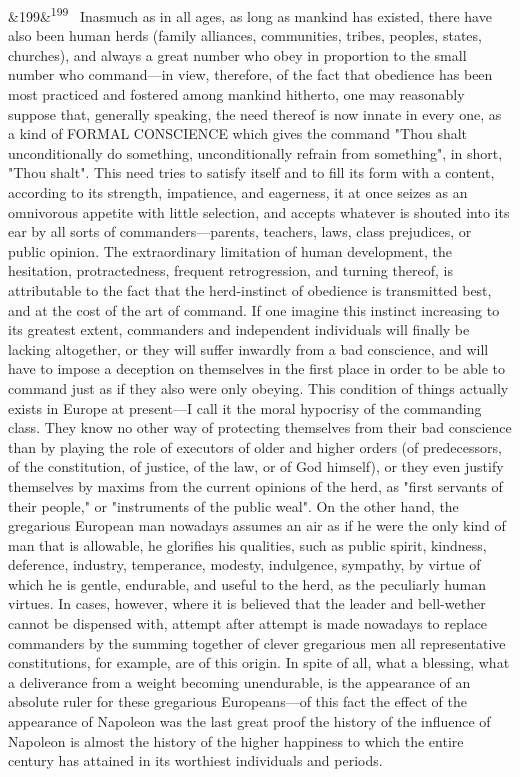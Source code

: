 \documentclass[12pt]{article}
\newcommand{\para}[1][]{\par\noindent\ifx&#1&\else\textsuperscript{\footnotesize #1}~\fi}
\begin{document}
\para[199] Inasmuch as in all ages, as long as mankind has existed, there have also been human herds (family alliances, communities, tribes, peoples, states, churches), and always a great number who obey in proportion to the small number who command---in view, therefore, of the fact that obedience has been most practiced and fostered among mankind hitherto, one may reasonably suppose that, generally speaking, the need thereof is now innate in every one, as a kind of FORMAL CONSCIENCE which gives the command "Thou shalt unconditionally do something, unconditionally refrain from something", in short, "Thou shalt". This need tries to satisfy itself and to fill its form with a content, according to its strength, impatience, and eagerness, it at once seizes as an omnivorous appetite with little selection, and accepts whatever is shouted into its ear by all sorts of commanders---parents, teachers, laws, class prejudices, or public opinion. The extraordinary limitation of human development, the hesitation, protractedness, frequent retrogression, and turning thereof, is attributable to the fact that the herd-instinct of obedience is transmitted best, and at the cost of the art of command. If one imagine this instinct increasing to its greatest extent, commanders and independent individuals will finally be lacking altogether, or they will suffer inwardly from a bad conscience, and will have to impose a deception on themselves in the first place in order to be able to command just as if they also were only obeying. This condition of things actually exists in Europe at present---I call it the moral hypocrisy of the commanding class. They know no other way of protecting themselves from their bad conscience than by playing the role of executors of older and higher orders (of predecessors, of the constitution, of justice, of the law, or of God himself), or they even justify themselves by maxims from the current opinions of the herd, as "first servants of their people," or "instruments of the public weal". On the other hand, the gregarious European man nowadays assumes an air as if he were the only kind of man that is allowable, he glorifies his qualities, such as public spirit, kindness, deference, industry, temperance, modesty, indulgence, sympathy, by virtue of which he is gentle, endurable, and useful to the herd, as the peculiarly human virtues. In cases, however, where it is believed that the leader and bell-wether cannot be dispensed with, attempt after attempt is made nowadays to replace commanders by the summing together of clever gregarious men all representative constitutions, for example, are of this origin. In spite of all, what a blessing, what a deliverance from a weight becoming unendurable, is the appearance of an absolute ruler for these gregarious Europeans---of this fact the effect of the appearance of Napoleon was the last great proof the history of the influence of Napoleon is almost the history of the higher happiness to which the entire century has attained in its worthiest individuals and periods.
\end{document}
